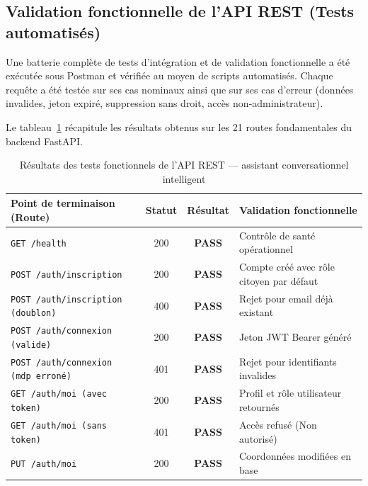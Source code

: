 \subsection{Validation fonctionnelle de l'API REST (Tests automatisés)}

Une batterie complète de tests d'intégration et de validation fonctionnelle a été exécutée sous Postman et vérifiée au moyen de scripts automatisés. Chaque requête a été testée sur ses cas nominaux ainsi que sur ses cas d'erreur (données invalides, jeton expiré, suppression sans droit, accès non-administrateur).

Le tableau~\ref{tab:tests_api} récapitule les résultats obtenus sur les 21 routes fondamentales du backend FastAPI.

\begin{table}[H]
\centering
\caption{Résultats des tests fonctionnels de l'API REST — assistant conversationnel intelligent}
\label{tab:tests_api}
\renewcommand{\arraystretch}{1.2}
\footnotesize
\begin{tabular}{|p{5.0cm}|c|c|p{4.6cm}|}
\hline
\textbf{Point de terminaison (Route)} & \textbf{Statut} & \textbf{Résultat} & \textbf{Validation fonctionnelle} \\
\hline
\texttt{GET /health} & 200 & \textcolor{green!60!black}{\textbf{PASS}} & Contrôle de santé opérationnel \\
\hline
\texttt{POST /auth/inscription} & 200 & \textcolor{green!60!black}{\textbf{PASS}} & Compte créé avec rôle citoyen par défaut \\
\hline
\texttt{POST /auth/inscription (doublon)} & 400 & \textcolor{green!60!black}{\textbf{PASS}} & Rejet pour email déjà existant \\
\hline
\texttt{POST /auth/connexion (valide)} & 200 & \textcolor{green!60!black}{\textbf{PASS}} & Jeton JWT Bearer généré \\
\hline
\texttt{POST /auth/connexion (mdp erroné)} & 401 & \textcolor{green!60!black}{\textbf{PASS}} & Rejet pour identifiants invalides \\
\hline
\texttt{GET /auth/moi (avec token)} & 200 & \textcolor{green!60!black}{\textbf{PASS}} & Profil et rôle utilisateur retournés \\
\hline
\texttt{GET /auth/moi (sans token)} & 401 & \textcolor{green!60!black}{\textbf{PASS}} & Accès refusé (Non autorisé) \\
\hline
\texttt{PUT /auth/moi} & 200 & \textcolor{green!60!black}{\textbf{PASS}} & Coordonnées modifiées en base \\

\end{tabular}
\end{table}
